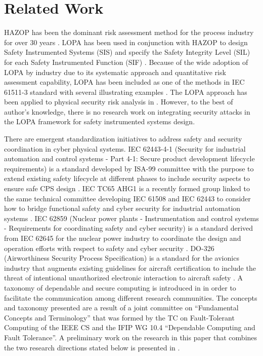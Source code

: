 \documentclass[journal]{IEEEtran}
\begin{document}
\section{Related Work} \label{sec:related-work}
HAZOP has been the dominant risk assessment method for the process industry for over 30 years \cite{Dunjo2010,Crawley2015,Kletz1999}. LOPA has been used in conjunction with HAZOP to design Safety Instrumented Systems (SIS) and specify the Safety Integrity Level (SIL) for each Safety Instrumented Function (SIF) \cite{Dowell1999}. Because of the wide adoption of LOPA by industry due to its systematic approach and quantitative risk assessment capability, LOPA has been included as one of the methods in IEC 61511-3 standard with several illustrating examples \cite{IEC61511}. The LOPA approach has been applied to physical security risk analysis in \cite{Garzia2018}. However, to the best of author's knowledge, there is no research work on integrating security attacks in the LOPA framework for safety instrumented systems design.

There are emergent standardization initiatives to address safety and security coordination in cyber physical systems. IEC 62443-4-1 (Security for industrial automation and control systems - Part 4-1: Secure product development lifecycle requirements) is a standard developed by ISA-99 committee with the purpose to extend existing safety lifecycle at different phases to include security aspects to ensure safe CPS design \cite{IEC2018}. IEC TC65 AHG1 is a recently formed group linked to the same technical committee developing IEC 61508 and IEC 62443 to consider how to bridge functional safety and cyber security for industrial automation systems \cite{Kanamaru2017}. IEC 62859 (Nuclear power plants - Instrumentation and control systems - Requirements for coordinating safety and cyber security) is a standard derived from IEC 62645 for the nuclear power industry to coordinate the design and operation efforts with respect to safety and cyber security \cite{IEC2016}. DO-326 (Airworthiness Security Process Specification) is a standard for the avionics industry that augments existing guidelines for aircraft certification to include the threat of intentional unauthorized electronic interaction to aircraft safety \cite{Torens2020}. A taxonomy of dependable and secure computing is introduced in \cite{Avizienis2004BasicComputing} in order to facilitate the communication among different research communities. The concepts and taxonomy presented are a result of a joint committee on “Fundamental Concepts and Terminology” that was formed by the TC on Fault-Tolerant Computing of the IEEE CS and the IFIP WG 10.4 “Dependable Computing and Fault Tolerance”. A preliminary work on the research in this paper that combines the two research directions stated below is presented in \cite{TantawyICSRS2019}.
\end{document}
